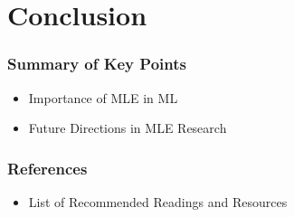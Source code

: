 \documentclass{beamer}
\begin{document}
\section{Conclusion}
\begin{frame}
\frametitle{Summary of Key Points}
\begin{itemize}
    \item Importance of MLE in ML
    \item Future Directions in MLE Research
\end{itemize}
\end{frame}

\begin{frame}
\frametitle{References}
\begin{itemize}
    \item List of Recommended Readings and Resources
\end{itemize}
\end{frame}
\end{document}

